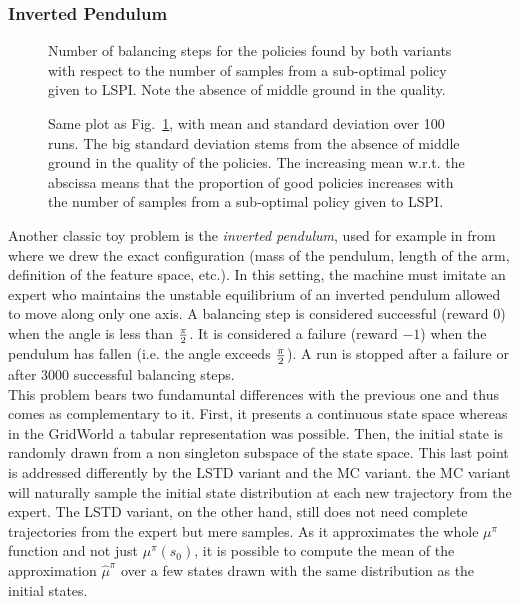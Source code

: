 \documentclass{jfpda2011}
\begin{document}
\subsubsection{Inverted Pendulum}
\begin{figure}
\centering
\resizebox{\columnwidth}{!}{}
\caption{Number of balancing steps for the policies found by both variants with respect to the number of samples from a sub-optimal policy given to LSPI. Note the absence of middle ground in the quality.}
\label{fig:threshold}
\end{figure}
\begin{figure}
\centering
\resizebox{\columnwidth}{!}{}
\caption{Same plot as Fig.~\ref{fig:threshold}, with mean and standard deviation over 100 runs. The big standard deviation stems from the absence of middle ground in the quality of the policies. The increasing mean w.r.t. the abscissa means that the proportion of good policies increases with the number of samples from a sub-optimal policy given to LSPI.}
\label{fig:threshold_EB}
\end{figure}
Another classic toy problem is the \emph{inverted pendulum}, used for example in \citep{lagoudakis2003least} from where we drew the exact configuration (mass of the pendulum, length of the arm, definition of the feature space, etc.). In this setting, the machine must imitate an expert who maintains the unstable equilibrium of an inverted pendulum allowed to move along only one axis. A balancing step is considered successful (reward $0$) when the angle is less than $\pi\over 2$. It is considered a failure (reward $-1$) when the pendulum has fallen (i.e. the angle exceeds $\pi \over 2$). A run is stopped after a failure or after 3000 successful balancing steps.\\

This problem bears two fundamuntal differences with the previous one and thus comes as complementary to it. First, it presents a continuous state space whereas in the GridWorld a tabular representation was possible. Then, the initial state is randomly drawn from a non singleton subspace of the state space. This last point is addressed differently by the LSTD variant and the MC variant. the MC variant will naturally sample the initial state distribution at each new trajectory from the expert. The LSTD variant, on the other hand, still does not need complete trajectories from the expert but mere samples. As it approximates the whole $\mu^{\pi}$ function and not just $\mu^\pi(s_0)$, it is possible to compute the mean of the approximation $\hat\mu^\pi$ over a few states drawn with the same distribution as the initial states.\\
\end{document}
